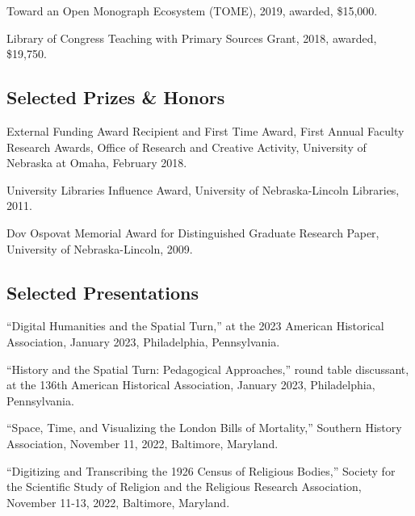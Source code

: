 \documentclass[10pt]{article}
\begin{document}
Toward an Open Monograph Ecosystem (TOME), 2019, awarded, \$15,000.

Library of Congress Teaching with Primary Sources Grant, 2018, awarded, \$19,750.

\subsection{Selected Prizes \& Honors}\label{prizes-and-honors}

External Funding Award Recipient and First Time Award, First Annual Faculty Research Awards, Office of Research and Creative Activity, University of Nebraska at Omaha, February 2018.

University Libraries Influence Award, University of Nebraska-Lincoln Libraries, 2011.

Dov Ospovat Memorial Award for Distinguished Graduate Research Paper, University of Nebraska-Lincoln, 2009.

\subsection{Selected Presentations}\label{presentations}

``Digital Humanities and the Spatial Turn,'' at the 2023 American Historical Association, January 2023, Philadelphia, Pennsylvania.

``History and the Spatial Turn: Pedagogical Approaches,'' round table discussant, at the 136th American Historical Association, January 2023, Philadelphia, Pennsylvania.

``Space, Time, and Visualizing the London Bills of Mortality,'' Southern History Association, November 11, 2022, Baltimore, Maryland.

``Digitizing and Transcribing the 1926 Census of Religious Bodies,'' Society for the Scientific Study of Religion and the Religious Research Association, November 11-13, 2022, Baltimore, Maryland.
\end{document}
